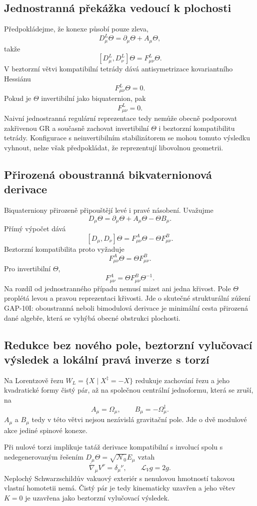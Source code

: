 \subsection{Jednostranná překážka vedoucí k plochosti}
Předpokládejme, že konexe působí pouze zleva,
\[
 D^L_\mu\Theta=\partial_\mu\Theta+A_\mu\Theta,
\]
takže
\[
 [D^L_\mu,D^L_\nu]\Theta=F^L_{\mu\nu}\Theta.
\]
V beztorzní větvi kompatibilní tetrády dává antisymetrizace kovariantního
Hessiánu
\[
 F^L_{\mu\nu}\Theta=0.
\]
Pokud je $\Theta$ invertibilní jako biquaternion, pak
\[
 F^L_{\mu\nu}=0.
\]
Naivní jednostranná regulární reprezentace tedy nemůže obecně podporovat
zakřivenou GR a současně zachovat invertibilní $\Theta$ i beztorzní
kompatibilitu tetrády. Konfigurace s neinvertibilním stabilizátorem se mohou
tomuto výsledku vyhnout, nelze však předpokládat, že reprezentují libovolnou
geometrii.

\subsection{Přirozená oboustranná bikvaternionová derivace}
Biquaterniony přirozeně připouštějí levé i pravé násobení. Uvažujme
\[
 \boxed{
 D_\mu\Theta=\partial_\mu\Theta+A_\mu\Theta-\Theta B_\mu.}
\]
Přímý výpočet dává
\[
 \boxed{
 [D_\mu,D_\nu]\Theta
 =F^A_{\mu\nu}\Theta-\Theta F^B_{\mu\nu}.}
\]
Beztorzní kompatibilita proto vyžaduje
\[
 F^A_{\mu\nu}\Theta=\Theta F^B_{\mu\nu}.
\]
Pro invertibilní $\Theta$,
\[
 \boxed{
 F^A_{\mu\nu}=\Theta F^B_{\mu\nu}\Theta^{-1}.}
\]
Na rozdíl od jednostranného případu nemusí mizet ani jedna křivost. Pole
$\Theta$ proplétá levou a pravou reprezentaci křivosti. Jde o skutečné
strukturální zúžení GAP-10I: oboustranná neboli bimodulová derivace je
minimální cesta přirozená dané algebře, která se vyhýbá obecné obstrukci
plochosti.

\subsection{Redukce bez nového pole, beztorzní vylučovací výsledek a lokální pravá inverze s torzí}
Na Lorentzově řezu $W_L=\{X\mid X^\ddagger=-X\}$ redukuje zachování řezu
a jeho kvadratické formy čistý pár, až na společnou centrální jednoformu,
která se zruší, na
\[
 \boxed{A_\mu=\Omega_\mu,\qquad B_\mu=-\Omega_\mu^\ddagger.}
\]
$A_\mu$ a $B_\mu$ tedy v této větvi nejsou nezávislá gravitační pole.
Jde o dvě modulové akce jediné spinové konexe.

Při nulové torzi implikuje tatáž derivace kompatibilní s involucí spolu s
nedegenerovaným řešením $D_\mu\Theta=\sqrt{\mathcal N_0}E_\mu$ vztah
\[
 \boxed{\mathring\nabla_\mu V^\nu=\delta_\mu{}^\nu,}
 \qquad \mathcal L_Vg=2g.
\]
Neplochý Schwarzschildův vakuový exteriér s nenulovou hmotností takovou
vlastní homotetii nemá. Čistý pár je tedy kinematicky uzavřen a jeho větev
$K=0$ je uzavřena jako beztorzní vylučovací výsledek.

